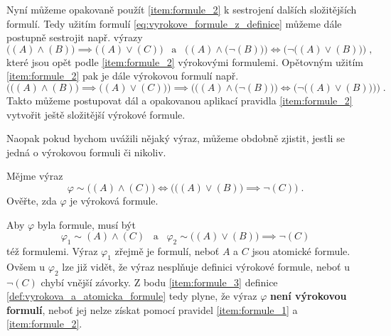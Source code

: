 Nyní můžeme opakovaně použít \ref{item:formule_2} k sestrojení dalších složitějších formulí. Tedy užitím formulí \eqref{eq:vyrokove_formule_z_definice} můžeme dále postupně sestrojit např. výrazy
\begin{equation*}
    \big((A) \land (B)\big) \implies \big((A) \lor (C)\big)\;\;\;\text{a}\;\;\;\Big((A) \land \big(\neg(B)\big)\Big) \iff \Big(\neg\big((A) \lor (B)\big)\Big)\; ,
\end{equation*}
které jsou opět podle \ref{item:formule_2} výrokovými formulemi. Opětovným užitím \ref{item:formule_2} pak je dále výrokovou formulí např.
\begin{equation*}
    \Big(\big((A) \land (B)\big) \implies \big((A) \lor (C)\big)\Big) \implies \bigg(\Big((A) \land \big(\neg(B)\big)\Big) \iff \Big(\neg\big((A) \lor (B)\big)\Big)\bigg)\; .
\end{equation*}
Takto můžeme postupovat dál a opakovanou aplikací pravidla \ref{item:formule_2} vytvořit ještě složitější výrokové formule.\par
Naopak pokud bychom uvážili nějaký výraz, můžeme obdobně zjistit, jestli se jedná o výrokovou formuli či nikoliv.
\begin{example}\label{ex:overeni_formule}
    Mějme výraz
    \begin{equation*}
        \varphi\sim\big((A) \land (C)\big) \iff \Big(\big((A) \lor (B)\big) \implies \neg(C)\Big)\; .
    \end{equation*}
    Ověřte, zda $\varphi$ je výroková formule.\par
    \begin{solution}
        Aby $\varphi$ byla formule, musí být
        \begin{equation*}
            \varphi_1\sim(A) \land (C)\;\;\;\text{a}\;\;\;\varphi_2\sim\big((A) \lor (B)\big) \implies \neg(C)
        \end{equation*}
        též formulemi. Výraz $\varphi_1$ zřejmě je formulí, neboť $A$ a $C$ jsou atomické formule. Ovšem u $\varphi_2$ lze již vidět, že výraz nesplňuje definici výrokové formule, neboť u $\neg(C)$ chybí vnější závorky. Z bodu \ref{item:formule_3} definice \ref{def:vyrokova_a_atomicka_formule} tedy plyne, že výraz $\varphi$ \textbf{není výrokovou formulí}, neboť jej nelze získat pomocí pravidel \ref{item:formule_1} a \ref{item:formule_2}.
    \end{solution}
\end{example}

